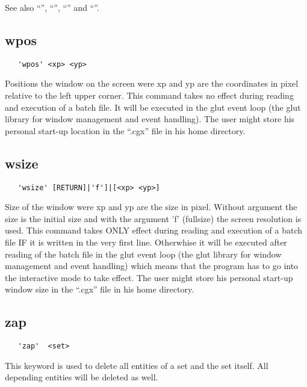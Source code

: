 \documentclass{article}
\begin{document}
See also ``'', ``'', ``'' and ``''.

\subsection{\label{wpos}wpos}
\begin{verbatim}
   'wpos' <xp> <yp>
\end{verbatim}
Positions the window on the screen were xp and yp are the coordinates in pixel relative to the left upper corner. This command takes no effect during reading and execution of a batch file. It will be executed in the glut event loop (the glut library \cite{glut} for window management and event handling). The user might store his personal start-up location in the ``.cgx'' file in his home directory.

\subsection{\label{wsize}wsize}
\begin{verbatim}
   'wsize' [RETURN]|'f']|[<xp> <yp>]
\end{verbatim}
Size of the window were xp and yp are the size in pixel. Without argument the size is the initial size and with the argument 'f' (fullsize) the screen resolution is used. This command takes ONLY effect during reading and execution of a batch file IF it is written in the very first line. Otherwhise it will be executed after reading of the batch file in the glut event loop (the glut library \cite{glut} for window management and event handling) which means that the program has to go into the interactive mode to take effect. The user might store his personal start-up window size in the ``.cgx'' file in his home directory.

\subsection{\label{zap}zap}
\begin{verbatim}
   'zap'  <set> 
\end{verbatim}
This keyword is used to delete all entities of a set and the set itself. All depending entities will be deleted as well.
\end{document}
